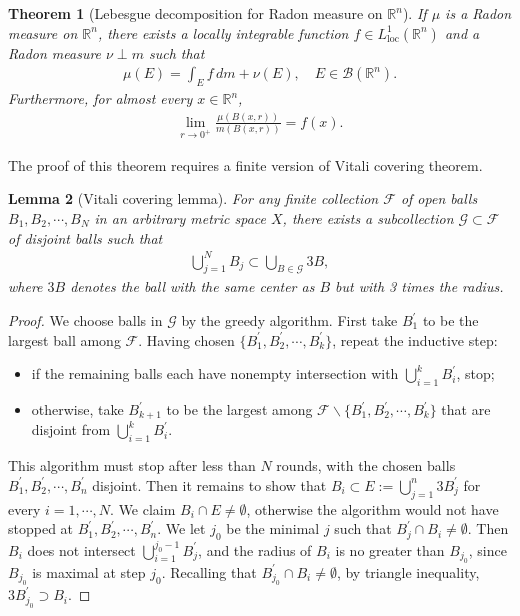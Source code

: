 \documentclass{article}
\numberwithin{equation}{section}
\newcommand{\bbR}{\mathbb{R}}
\renewcommand{\cal}{\mathcal}
\newcommand{\loc}{\mathrm{loc}}
\theoremstyle{plain}
\newtheorem{theorem}{Theorem}[section]
\newtheorem{lemma}[theorem]{Lemma}
\theoremstyle{definition}
\begin{document}
\begin{theorem}[Lebesgue decomposition for Radon measure on $\bbR^n$]\label{lebradondecomp}
	If $\mu$ is a Radon measure on $\bbR^n$, there exists a locally integrable function $f\in L_\loc^1(\bbR^n)$ and a Radon measure $\nu\perp m$ such that
	\begin{align}
		\mu(E)=\int_E f\,dm+\nu(E),\quad E\in\mathscr{B}(\bbR^n).\label{lebdecomp}
	\end{align}
	Furthermore, for almost every $x\in\bbR^n$,
	\begin{align}
		\lim_{r\to 0^+}\frac{\mu(B(x,r))}{m(B(x,r))}=f(x).\label{lebradondiff}
	\end{align}
\end{theorem}

The proof of this theorem requires a finite version of Vitali covering theorem.

\begin{lemma}[Vitali covering lemma]\label{vitalicover}
	For any finite collection $\cal{F}$ of open balls $B_1,B_2,\cdots,B_N$ in an arbitrary metric space $X$, there exists a subcollection $\cal{G}\subset\cal{F}$ of disjoint balls such that
	\begin{align*}
		\bigcup_{j=1}^NB_j\subset \bigcup_{B\in\cal{G}}3B,
	\end{align*}
	where $3B$ denotes the ball with the same center as $B$ but with 3 times the radius.
\end{lemma}
\begin{proof}
	We choose balls in $\cal{G}$ by the greedy algorithm. First take $B_1^\prime$ to be the largest ball among $\cal{F}$. Having chosen $\{B_1^\prime,B_2^\prime,\cdots,B_k^\prime\}$, repeat the inductive step:
	\begin{itemize}
		\item if the remaining balls each have nonempty intersection with $\bigcup_{i=1}^k B_i^\prime$, stop;
		\item otherwise, take $B_{k+1}^\prime$ to be the largest among $\cal{F}\backslash\{B_1^\prime,B_2^\prime,\cdots,B_k^\prime\}$ that are disjoint from $\bigcup_{i=1}^k B_i^\prime$.
	\end{itemize}
	This algorithm must stop after less than $N$ rounds, with the chosen balls $B_1^\prime,B_2^\prime,\cdots,B_n^\prime$ disjoint. Then it remains to show that $B_i\subset E:=\bigcup_{j=1}^n 3B_j^\prime$ for every $i=1,\cdots,N$. We claim $B_i\cap E\neq\emptyset$, otherwise the algorithm would not have stopped at $B_1^\prime,B_2^\prime,\cdots,B_n^\prime$. We let $j_0$ be the minimal $j$ such that $B_j^\prime\cap B_i\neq\emptyset$. Then $B_i$ does not intersect $\bigcup_{i=1}^{j_0-1}B_j^\prime$, and the radius of $B_i$ is no greater than $B_{j_0}$, since $B_{j_0}$ is maximal at step $j_0$. Recalling that $B_{j_0}^\prime\cap B_i\neq\emptyset$, by triangle inequality, $3B_{j_0}^\prime \supset B_i$.
\end{proof}
\end{document}
